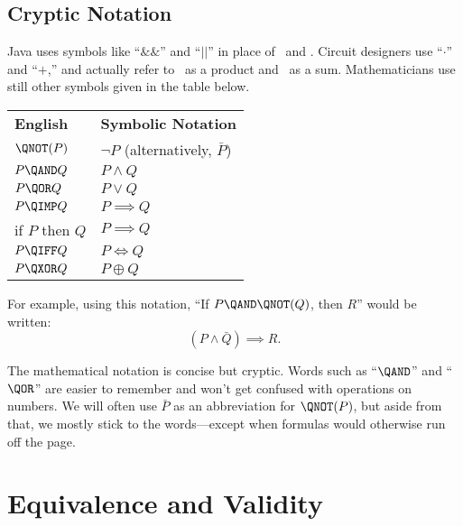 \subsection{Cryptic Notation}
Java uses symbols like ``$\&\&$'' and ``$||$'' in place of \QAND\ and
\QOR.  Circuit designers use ``$\cdot$'' and ``$+$,'' and actually refer
to \QAND\ as a product and \QOR\ as a sum.  Mathematicians use still
other symbols given in the table below.
%
\begin{center}
\begin{tabular}{ll}
\textbf{English} & \textbf{Symbolic Notation} \\[1ex]
$\QNOT(P)$ & $\neg P$ \quad (alternatively, $\bar{P}$) \\
$P \QAND Q$ & $P \land Q$ \\
$P \QOR Q$ & $P \lor Q$ \\
$P \QIMP Q$ & $P \implies Q$ \\
if $P$ then $Q$ & $P \implies Q$ \\
$P \QIFF Q$ & $P \iff Q$\\
$P \QXOR Q$ & $P \oplus Q$
\end{tabular}
\end{center}
%
For example, using this notation, ``If $P \QAND \QNOT(Q)$, then $R$''
would be written:
%
\[
    (P \land \bar{Q}) \implies R.
\]

The mathematical notation is concise but cryptic.  Words such as
``$\QAND$'' and ``$\QOR$'' are easier to remember and won't get
confused with operations on numbers.  We will often use $\bar{P}$ as
an abbreviation for $\QNOT(P)$, but aside from that, we mostly stick
to the words---except when formulas would otherwise run off the page.

\begin{problems}
\classproblems
{}

\homeworkproblems
{}
\end{problems}

\section{Equivalence and Validity}\label{equiv_valid_sec}

